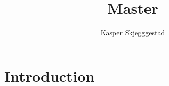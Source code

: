 \documentclass[a4paper,UKenglish]{article}
\title{Master}
\author{Kasper Skjegggestad}
\begin{document}
\maketitle
\tableofcontents

\section{Introduction}
\end{document}
